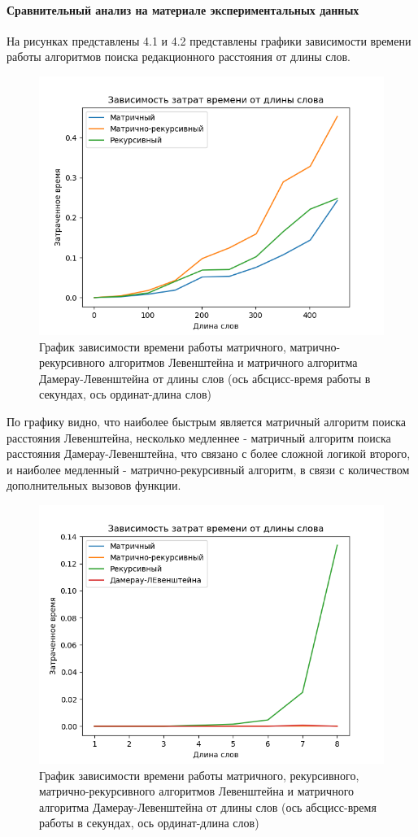 \paragraph{Сравнительный анализ на материале экспериментальных данных}
На рисунках представлены 4.1 и 4.2 представлены графики зависимости времени работы алгоритмов поиска редакционного расстояния от длины слов.\\
\begin{figure}[H]
	\centering
	\includegraphics[width=0.7\linewidth]{src/Figure_1}
	\caption{График зависимости времени работы матричного, матрично-рекурсивного алгоритмов Левенштейна и матричного алгоритма Дамерау-Левенштейна от длины слов (ось абсцисс-время работы в секундах, ось ординат-длина слов)}
	\label{fig:figure1}
\end{figure}
По графику видно, что наиболее быстрым является матричный алгоритм поиска расстояния Левенштейна, несколько медленнее - матричный алгоритм поиска расстояния Дамерау-Левенштейна, что связано с более сложной логикой второго, и наиболее медленный - матрично-рекурсивный алгоритм, в связи с количеством дополнительных вызовов функции.\\
\begin{figure}[H]
	\centering
	\includegraphics[width=0.7\linewidth]{src/Figure_2}
	\caption{График зависимости времени работы матричного, рекурсивного, матрично-рекурсивного алгоритмов Левенштейна и матричного алгоритма Дамерау-Левенштейна от длины слов (ось абсцисс-время работы в секундах, ось ординат-длина слов)}
	\label{fig:figure2}
\end{figure}
